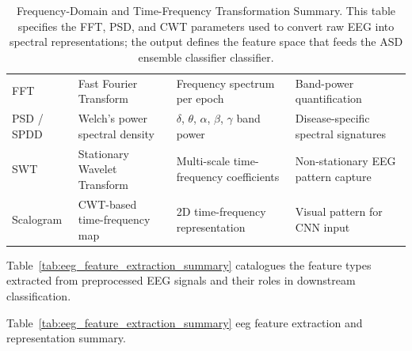 {\tablestripes\tablefontsize
{}
\begin{xltabular}{\textwidth}{@{} l L L L @{}}
\caption[Frequency-Domain and Time-Frequency Transformation Summary]{Frequency-Domain and Time-Frequency Transformation Summary. This table specifies the FFT, PSD, and CWT parameters used to convert raw EEG into spectral representations; the output defines the feature space that feeds the ASD ensemble classifier classifier.}\label{tab:freq_transform_summary} \\
\toprule
{} &  &  &  \\
\midrule
\endfirsthead
\endhead
\bottomrule
\endlastfoot
FFT & Fast Fourier Transform & Frequency spectrum per epoch & Band-power quantification \\
PSD / SPDD & Welch's power spectral density & $\delta$, $\theta$, $\alpha$, $\beta$, $\gamma$ band power & Disease-specific spectral signatures \\
SWT & Stationary Wavelet Transform & Multi-scale time-frequency coefficients & Non-stationary EEG pattern capture \\
Scalogram & CWT-based time-frequency map & 2D time-frequency representation & Visual pattern for CNN input \\
\end{xltabular}}
\fi %

\noindent Table~\ref{tab:eeg_feature_extraction_summary} catalogues the feature types extracted from preprocessed EEG signals and their roles in downstream classification.

\iffalse %

\noindent Table~\ref{tab:eeg_feature_extraction_summary} eeg feature extraction and representation summary.

